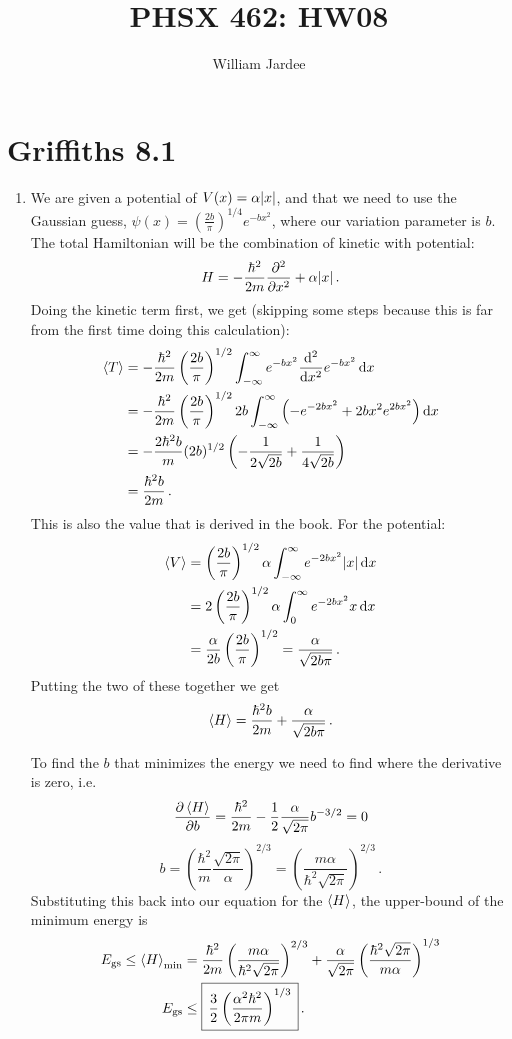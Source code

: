 \documentclass[11pt]{article}
\begin{document}
\title{PHSX 462: HW08}
\author{William Jardee}
\maketitle


\section*{Griffiths 8.1}
\begin{enumerate}[label=\alph*)]
\item We are given a potential of $V(x) = \alpha \abs{x}$, and that we need to use the Gaussian guess, $\displaystyle{\psi(x) = \left(\frac{2b}{\pi}\right)^{1/4}e^{-bx^2}}$, where our variation parameter is $b$. The total Hamiltonian will be the combination of kinetic with potential:
\[H = -\frac{\hbar^2}{2m}\pdv[2]{x} + \alpha\abs{x} \, .\]
Doing the kinetic term first, we get (skipping some steps because this is far from the first time doing this calculation):
\begin{align*}
\ev{T} & = -\frac{\hbar^2}{2m}\left(\frac{2b}{\pi}\right)^{1/2}\int_{-\infty}^\infty e^{-bx^2}\dv[2]{x}e^{-bx^2}\dd{x}\\
& = -\frac{\hbar^2}{2m}\left(\frac{2b}{\pi}\right)^{1/2}2b\int_{-\infty}^\infty \left(-e^{-2bx^2} + 2bx^2e^{2bx^2}\right)\dd{x}\\
& = -\frac{2\hbar^2 b}{m}(2b)^{1/2}\left(-\frac{1}{2\sqrt{2b}} + \frac{1}{4\sqrt{2b}}\right)\\
& = \frac{\hbar^2 b}{2m} \, .
\end{align*}
This is also the value that is derived in the book. For the potential:
\begin{align*}
\ev{V} & = \left(\frac{2b}{\pi}\right)^{1/2} \alpha \int_{-\infty}^\infty e^{-2bx^2} \abs{x} \dd{x}\\
& = 2\left(\frac{2b}{\pi}\right)^{1/2} \alpha \int_0^\infty e^{-2bx^2} x \dd{x} \\
 & = \frac{\alpha}{2b}\left(\frac{2b}{\pi}\right)^{1/2} = \frac{\alpha}{\sqrt{2b\pi}} \, . 
\end{align*}
Putting the two of these together we get
\[\ev{H} = \frac{\hbar^2 b}{2m} + \frac{\alpha}{\sqrt{2b\pi}} \, . \]

To find the $b$ that minimizes the energy we need to find where the derivative is zero, i.e.
\[\pdv{\ev{H}}{b} = \frac{\hbar^2}{2m} - \frac{1}{2}\frac{\alpha}{\sqrt{2\pi}}b^{-3/2} = 0\]
\[b = \left(\frac{\hbar^2}{m}\frac{\sqrt{2\pi}}{\alpha}\right)^{2/3} = \left(\frac{m\alpha}{\hbar^2\sqrt{2\pi}}\right)^{2/3} \, .\]
Substituting this back into our equation for the $\ev{H}$, the upper-bound of the minimum energy is
\begin{align*}
E_\text{gs} \leq \ev{H}_\text{min} & = \frac{\hbar^2}{2m}\left(\frac{m\alpha}{\hbar^2 \sqrt{2\pi}}\right)^{2/3} + \frac{\alpha}{\sqrt{2\pi}}\left(\frac{\hbar^2 \sqrt{2\pi}}{m\alpha}\right)^{1/3}\\
E_\text{gs} & \leq \boxed{ \, \frac{3}{2}\left(\frac{\alpha^2 \hbar^2}{2\pi m}\right)^{1/3} \,} \, . 
\end{align*}


\end{enumerate}
\end{document}
